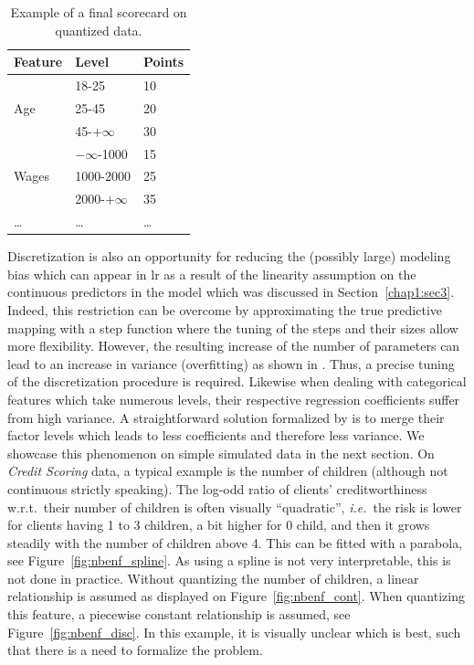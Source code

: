 \begin{table}
\centering
\caption{\label{tab:ex_scorecard} Example of a final scorecard on quantized data.}
\begin{tabular}{p{3cm}|p{3cm}|p{2cm}}
Feature & Level & Points \\
\hline
\hline
\multirow{3}{*}{Age} & 18-25 & 10 \\
 & 25-45 & 20 \\
 & 45-$+\infty$ & 30 \\
 \hline
\multirow{3}{*}{Wages} & $-\infty$-1000 & 15 \\
 & 1000-2000 & 25 \\
 & 2000-$+\infty$ & 35 \\
 \dots & \dots & \dots \\
\end{tabular}
\end{table}


Discretization is also an opportunity for reducing the (possibly large) modeling bias which can appear in \gls{lr} as a result of the linearity assumption on the continuous predictors in the model which was discussed in Section~\ref{chap1:sec3}. Indeed, this restriction can be overcome by approximating the true predictive mapping with a step function where the tuning of the steps and their sizes allow more flexibility. However, the resulting increase of the number of parameters can lead to an increase in variance (overfitting) as shown in \cite{yang2009discretization}. Thus, a precise tuning of the discretization procedure is required. Likewise when dealing with categorical features which take numerous levels, their respective regression coefficients suffer from high variance. A straightforward solution formalized by \cite{maj2015delete} is to merge their factor levels which leads to less coefficients and therefore less variance. We showcase this phenomenon on simple simulated data in the next section. On \textit{Credit Scoring} data, a typical example is the number of children (although not continuous strictly speaking). The log-odd ratio of clients' creditworthiness w.r.t.\ their number of children is often visually ``quadratic'', \textit{i.e.}\ the risk is lower for clients having 1 to 3 children, a bit higher for 0 child, and then it grows steadily with the number of children above 4. This can be fitted with a parabola, see Figure~\ref{fig:nbenf_spline}. As using a spline is not very interpretable, this is not done in practice. Without quantizing the number of children, a linear relationship is assumed as displayed on Figure~\ref{fig:nbenf_cont}. When quantizing this feature, a piecewise constant relationship is assumed, see Figure~\ref{fig:nbenf_disc}. In this example, it is visually unclear which is best, such that there is a need to formalize the problem.


